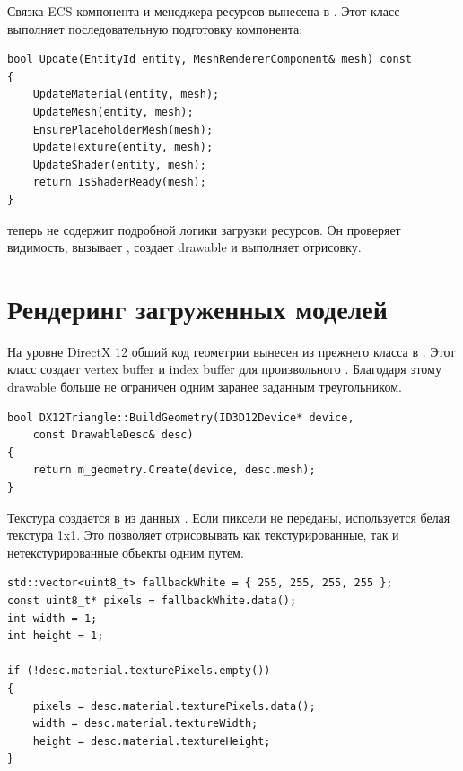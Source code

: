 \documentclass[14pt,a4paper]{extarticle}
\begin{document}
Связка ECS-компонента и менеджера ресурсов вынесена в . Этот класс выполняет
последовательную подготовку компонента:

\begin{lstlisting}[style=cppgost,caption={Последовательность подготовки ресурсов}]
bool Update(EntityId entity, MeshRendererComponent& mesh) const
{
    UpdateMaterial(entity, mesh);
    UpdateMesh(entity, mesh);
    EnsurePlaceholderMesh(mesh);
    UpdateTexture(entity, mesh);
    UpdateShader(entity, mesh);
    return IsShaderReady(mesh);
}
\end{lstlisting}

 теперь не содержит подробной логики загрузки ресурсов. Он проверяет видимость,
вызывает , создает drawable и выполняет отрисовку.

\section{Рендеринг загруженных моделей}

На уровне DirectX 12 общий код геометрии вынесен из прежнего класса  в
. Этот класс создает vertex buffer и index buffer для произвольного
. Благодаря этому drawable больше не ограничен одним заранее заданным треугольником.

\begin{lstlisting}[style=cppgost,caption={Использование общей геометрии в drawable}]
bool DX12Triangle::BuildGeometry(ID3D12Device* device,
    const DrawableDesc& desc)
{
    return m_geometry.Create(device, desc.mesh);
}
\end{lstlisting}

Текстура создается в  из данных . Если пиксели не переданы,
используется белая текстура 1x1. Это позволяет отрисовывать как текстурированные, так и нетекстурированные
объекты одним путем.

\begin{lstlisting}[style=cppgost,caption={Fallback-текстура}]
std::vector<uint8_t> fallbackWhite = { 255, 255, 255, 255 };
const uint8_t* pixels = fallbackWhite.data();
int width = 1;
int height = 1;

if (!desc.material.texturePixels.empty())
{
    pixels = desc.material.texturePixels.data();
    width = desc.material.textureWidth;
    height = desc.material.textureHeight;
}
\end{lstlisting}
\end{document}
